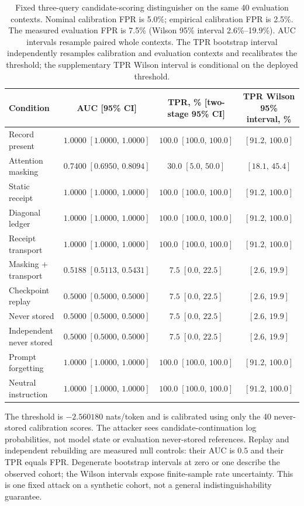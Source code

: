 \begin{table}[t]
\centering
\small
\setlength{\tabcolsep}{6pt}
\caption{Fixed three-query candidate-scoring distinguisher on the same 40 evaluation contexts. Nominal calibration FPR is 5.0\%; empirical calibration FPR is 2.5\%. The measured evaluation FPR is 7.5\% (Wilson 95\% interval 2.6\%--19.9\%). AUC intervals resample paired whole contexts. The TPR bootstrap interval independently resamples calibration and evaluation contexts and recalibrates the threshold; the supplementary TPR Wilson interval is conditional on the deployed threshold.}
\label{tab:kda-prospective-attack}
\begin{tabular}{lccc}
\hline
Condition & AUC [95\% CI] & TPR, \% [two-stage 95\% CI] & TPR Wilson 95\% interval, \% \\
\hline
Record present & $1.0000\;[1.0000,\,1.0000]$ & $100.0\;[100.0,\,100.0]$ & $[91.2,\,100.0]$ \\
Attention masking & $0.7400\;[0.6950,\,0.8094]$ & $30.0\;[5.0,\,50.0]$ & $[18.1,\,45.4]$ \\
Static receipt & $1.0000\;[1.0000,\,1.0000]$ & $100.0\;[100.0,\,100.0]$ & $[91.2,\,100.0]$ \\
Diagonal ledger & $1.0000\;[1.0000,\,1.0000]$ & $100.0\;[100.0,\,100.0]$ & $[91.2,\,100.0]$ \\
Receipt transport & $1.0000\;[1.0000,\,1.0000]$ & $100.0\;[100.0,\,100.0]$ & $[91.2,\,100.0]$ \\
Masking + transport & $0.5188\;[0.5113,\,0.5431]$ & $7.5\;[0.0,\,22.5]$ & $[2.6,\,19.9]$ \\
Checkpoint replay & $0.5000\;[0.5000,\,0.5000]$ & $7.5\;[0.0,\,22.5]$ & $[2.6,\,19.9]$ \\
Never stored & $0.5000\;[0.5000,\,0.5000]$ & $7.5\;[0.0,\,22.5]$ & $[2.6,\,19.9]$ \\
Independent never stored & $0.5000\;[0.5000,\,0.5000]$ & $7.5\;[0.0,\,22.5]$ & $[2.6,\,19.9]$ \\
Prompt forgetting & $1.0000\;[1.0000,\,1.0000]$ & $100.0\;[100.0,\,100.0]$ & $[91.2,\,100.0]$ \\
Neutral instruction & $1.0000\;[1.0000,\,1.0000]$ & $100.0\;[100.0,\,100.0]$ & $[91.2,\,100.0]$ \\
\hline
\end{tabular}
\par\vspace{3pt}
\begin{minipage}{0.98\textwidth}\footnotesize
The threshold is $-2.560180$ nats/token and is calibrated using only the 40 never-stored calibration scores. The attacker sees candidate-continuation log probabilities, not model state or evaluation never-stored references. Replay and independent rebuilding are measured null controls: their AUC is $0.5$ and their TPR equals FPR. Degenerate bootstrap intervals at zero or one describe the observed cohort; the Wilson intervals expose finite-sample rate uncertainty. This is one fixed attack on a synthetic cohort, not a general indistinguishability guarantee.
\end{minipage}
\end{table}
